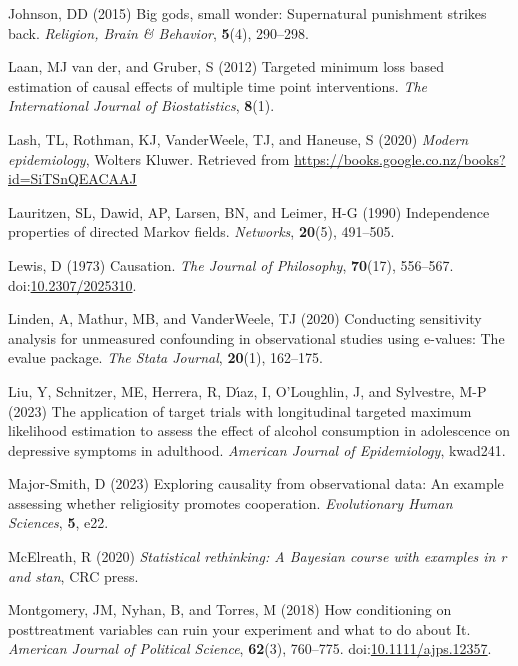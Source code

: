 \documentclass[
  single column]{article}
\newlength{\cslhangindent}
\newenvironment{CSLReferences}[2] %
 {\begin{list}{}{%
  \setlength{\itemindent}{0pt}
  \setlength{\leftmargin}{0pt}
  \setlength{\parsep}{0pt}
  \ifodd #1
   \setlength{\leftmargin}{\cslhangindent}
   \setlength{\itemindent}{-1\cslhangindent}
  \fi
  \setlength{\itemsep}{#2\baselineskip}}}
 {\end{list}}
\begin{document}
\begin{CSLReferences}{1}{0}
Johnson, DD (2015) Big gods, small wonder: Supernatural punishment
strikes back. \emph{Religion, Brain \& Behavior}, \textbf{5}(4),
290--298.

Laan, MJ van der, and Gruber, S (2012) Targeted minimum loss based
estimation of causal effects of multiple time point interventions.
\emph{The International Journal of Biostatistics}, \textbf{8}(1).

Lash, TL, Rothman, KJ, VanderWeele, TJ, and Haneuse, S (2020)
\emph{Modern epidemiology}, Wolters Kluwer. Retrieved from
\url{https://books.google.co.nz/books?id=SiTSnQEACAAJ}

Lauritzen, SL, Dawid, AP, Larsen, BN, and Leimer, H-G (1990)
Independence properties of directed {M}arkov fields. \emph{Networks},
\textbf{20}(5), 491--505.

Lewis, D (1973) Causation. \emph{The Journal of Philosophy},
\textbf{70}(17), 556--567.
doi:\href{https://doi.org/10.2307/2025310}{10.2307/2025310}.

Linden, A, Mathur, MB, and VanderWeele, TJ (2020) Conducting sensitivity
analysis for unmeasured confounding in observational studies using
e-values: The evalue package. \emph{The Stata Journal}, \textbf{20}(1),
162--175.

Liu, Y, Schnitzer, ME, Herrera, R, Dı́az, I, O'Loughlin, J, and
Sylvestre, M-P (2023) The application of target trials with longitudinal
targeted maximum likelihood estimation to assess the effect of alcohol
consumption in adolescence on depressive symptoms in adulthood.
\emph{American Journal of Epidemiology}, kwad241.

Major-Smith, D (2023) Exploring causality from observational data: An
example assessing whether religiosity promotes cooperation.
\emph{Evolutionary Human Sciences}, \textbf{5}, e22.

McElreath, R (2020) \emph{Statistical rethinking: A {B}ayesian course
with examples in r and stan}, CRC press.

Montgomery, JM, Nyhan, B, and Torres, M (2018) How conditioning on
posttreatment variables can ruin your experiment and what to do about
It. \emph{American Journal of Political Science}, \textbf{62}(3),
760--775.
doi:\href{https://doi.org/10.1111/ajps.12357}{10.1111/ajps.12357}.


\end{CSLReferences}
\end{document}

